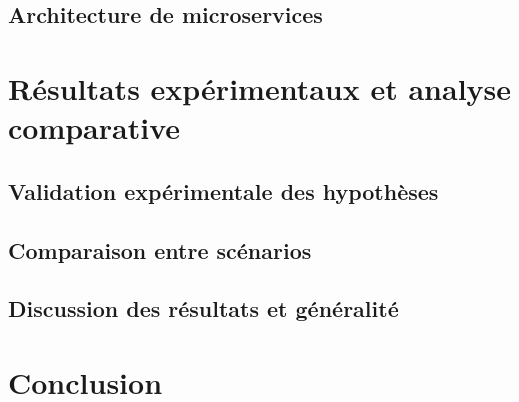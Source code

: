 \section{Architecture de microservices}

\chapter{Résultats expérimentaux et analyse comparative}
\section{Validation expérimentale des hypothèses}
\section{Comparaison entre scénarios}
\section{Discussion des résultats et généralité}

\chapter*{Conclusion}
